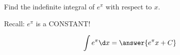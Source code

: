 \documentclass{ximera}
\author{Gregory Hartman \and Matthew Carr\and Nela Lakos}
\begin{document}
\begin{exercise}


Find the indefinite integral of $e^{\pi}$ with respect to $x$.
\begin{hint}
Recall: $e^{\pi}$ is a CONSTANT!
\end{hint}
\[
\int e^{\pi}\d x=\answer{e^{\pi} x+C}
\]


\end{exercise}
\end{document}

